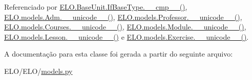 Referenciado por \hyperlink{classELO_1_1BaseUnit_1_1IfBaseType_a69c338f6f1574bd3524e9d59ebc17a7c}{E\-L\-O.\-Base\-Unit.\-If\-Base\-Type.\-\_\-\-\_\-cmp\-\_\-\-\_\-()}, \hyperlink{classELO_1_1models_1_1Adm_a3541c3ae12b8d2da3f44ac6be00a23e6}{E\-L\-O.\-models.\-Adm.\-\_\-\-\_\-unicode\-\_\-\-\_\-()}, \hyperlink{classELO_1_1models_1_1Professor_aefc9d63d429e19ec3487a7879879f29d}{E\-L\-O.\-models.\-Professor.\-\_\-\-\_\-unicode\-\_\-\-\_\-()}, \hyperlink{classELO_1_1models_1_1Courses_a8926a37152be8d4fc3e0ba6af200f871}{E\-L\-O.\-models.\-Courses.\-\_\-\-\_\-unicode\-\_\-\-\_\-()}, \hyperlink{classELO_1_1models_1_1Module_a1b54aa7a5e8dac090dea0926eca5550d}{E\-L\-O.\-models.\-Module.\-\_\-\-\_\-unicode\-\_\-\-\_\-()}, \hyperlink{classELO_1_1models_1_1Lesson_a3d9f0295dbe1ed5c74668d6c0876f97c}{E\-L\-O.\-models.\-Lesson.\-\_\-\-\_\-unicode\-\_\-\-\_\-()} e \hyperlink{classELO_1_1models_1_1Exercise_af3e991e5610cec815a2c3260ec6aae0b}{E\-L\-O.\-models.\-Exercise.\-\_\-\-\_\-unicode\-\_\-\-\_\-()}.



A documentação para esta classe foi gerada a partir do seguinte arquivo\-:\begin{DoxyCompactItemize}
\item 
E\-L\-O/\-E\-L\-O/\hyperlink{ELO_2models_8py}{models.\-py}\end{DoxyCompactItemize}

